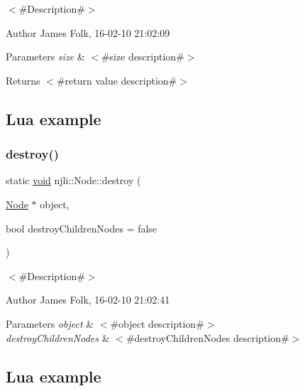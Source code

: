 $<$\#\+Description\#$>$ 

\begin{DoxyAuthor}{Author}
James Folk, 16-\/02-\/10 21\+:02\+:09
\end{DoxyAuthor}

\begin{DoxyParams}{Parameters}
{\em size} & $<$\#size description\#$>$\\
\hline
\end{DoxyParams}
\begin{DoxyReturn}{Returns}
$<$\#return value description\#$>$
\end{DoxyReturn}
\hypertarget{classnjli_1_1_steering_behavior_wander_ex1}{}\subsection{Lua example}\label{classnjli_1_1_steering_behavior_wander_ex1}

\begin{DoxyCodeInclude}
\end{DoxyCodeInclude}
\mbox{\label{classnjli_1_1_node_a1dac5d53dc1ceea187d3f616e8435da7}} 
\subsubsection{\texorpdfstring{destroy()}{destroy()}}
{\footnotesize\ttfamily static \mbox{\hyperlink{_thread_8h_af1e856da2e658414cb2456cb6f7ebc66}{void}} njli\+::\+Node\+::destroy (\begin{DoxyParamCaption}\item[{\mbox{\hyperlink{classnjli_1_1_node}{Node}} $\ast$}]{object,  }\item[{bool}]{destroy\+Children\+Nodes = {\ttfamily false} }\end{DoxyParamCaption})\hspace{0.3cm}{\ttfamily [static]}}



$<$\#\+Description\#$>$ 

\begin{DoxyAuthor}{Author}
James Folk, 16-\/02-\/10 21\+:02\+:41
\end{DoxyAuthor}

\begin{DoxyParams}{Parameters}
{\em object} & $<$\#object description\#$>$ \\
\hline
{\em destroy\+Children\+Nodes} & $<$\#destroy\+Children\+Nodes description\#$>$\\
\hline
\end{DoxyParams}
\hypertarget{classnjli_1_1_steering_behavior_wander_ex1}{}\subsection{Lua example}\label{classnjli_1_1_steering_behavior_wander_ex1}

